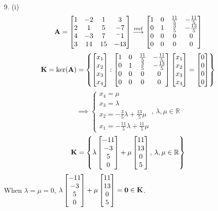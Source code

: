 \documentclass[a4paper]{article}
\begin{document}
\def\arraystretch{1.25}
9.
(i)
\[{\bf A}=
\begin{bmatrix}
1&-2&1&3\\
2&1&5&-7\\
4&-3&7&^-1\\
3&14&15&-43
\end{bmatrix}
\overset{\text{rref}}{\longrightarrow}
\begin{bmatrix}
	1&0&\frac{11}5&-\frac{11}5\\
0&1&\frac35&-\frac{13}5\\
0&0&0&0\\
0&0&0&0
\end{bmatrix}\]
\[{\bf K}=\ker({\bf A})=
	\left\{\begin{bmatrix}x_1\\x_2\\x_3\\x_4\end{bmatrix}:
\begin{bmatrix}
	1&0&\frac{11}5&-\frac{11}5\\
0&1&\frac35&-\frac{13}5\\
0&0&0&0\\
0&0&0&0
\end{bmatrix}
\begin{bmatrix}x_1\\x_2\\x_3\\x_4\end{bmatrix}
=\begin{bmatrix}0\\0\\0\\0\end{bmatrix}
\right\}\]
\[\implies\begin{cases}
	x_4=\mu\\
	x_3=\lambda\\
	x_2=-\frac35\lambda+\frac{13}5\mu\\
	x_1=-\frac{11}5\lambda+\frac{11}5\mu
\end{cases},\,\lambda,\mu\in\mathbb R\]
\[{\bf K}=
	\left\{\lambda\begin{bmatrix}-11\\-3\\5\\0\end{bmatrix}+\mu\begin{bmatrix}11\\13\\0\\5\end{bmatrix},\,\lambda,\mu\in\mathbb R\right\}
\]
When \(\lambda=\mu=0\), \(\lambda\begin{bmatrix}-11\\-3\\5\\0\end{bmatrix}+\mu\begin{bmatrix}11\\13\\0\\5\end{bmatrix}={\bf 0}\in{\bf K}\). 
\end{document}
